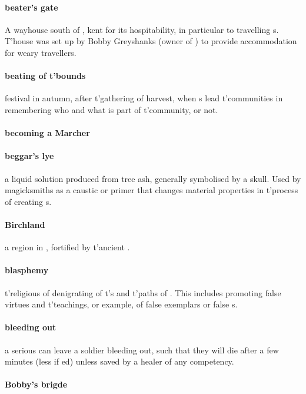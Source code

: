 \paragraph{beater's gate} A wayhouse south of , kent for its hospitability, in particular to travelling s. T'house was set up by Bobby Greyshanks (owner of ) to provide accommodation for weary travellers.
\paragraph{beating of t'bounds} festival in autumn, after t'\allowbreak gathering of harvest, when s lead t'\allowbreak communities in remembering who and what is part of t'\allowbreak community, or not. 
\paragraph{becoming a Marcher} 
\paragraph{beggar's lye} a liquid solution produced from tree ash, generally symbolised by a skull. Used by magicksmiths as a caustic or primer that changes material properties in t'\allowbreak process of creating s.
\paragraph{Birchland} a region in , fortified by t'\allowbreak ancient .
\paragraph{blasphemy} t'\allowbreak religious  of denigrating of t'\allowbreak {}s and t'\allowbreak paths of . This includes promoting false virtues and t'\allowbreak teachings, or example, of false exemplars or false s.
\paragraph{bleeding out} a serious  can leave a soldier bleeding out, such that they will die after a few minutes (less if ed) unless saved by a healer of any competency.
\paragraph{Bobby's brigde} 
